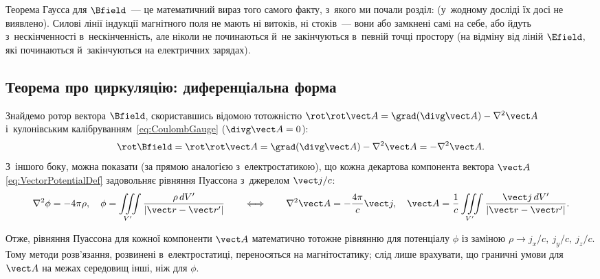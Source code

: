\begin{Attention}[unbreakable]
	Теорема Гаусса для $\Bfield$~--- це математичний вираз того самого факту, з~якого ми
	почали розділ:  (у~жодному досліді їх досі не
	виявлено). Силові лінії індукції магнітного поля не мають ні витоків, ні стоків~---
	вони або замкнені самі на себе, або йдуть з~нескінченності в~нескінченність, але
	ніколи не починаються й~не закінчуються в~певній точці простору (на відміну від ліній
	$\Efield$, які починаються й~закінчуються на електричних зарядах).
\end{Attention}


\subsection*{Теорема про циркуляцію: диференціальна форма}


Знайдемо ротор вектора $\Bfield$, скориставшись відомою тотожністю $\rot\rot\vect A =
	\grad(\divg\vect A) - \nabla^2\vect A$ і~кулонівським
калібруванням~\eqref{eq:CoulombGauge} ($\divg\vect A = 0$):
\begin{equation}\label{eq:CurlBDiff}
	\rot\Bfield = \rot\rot\vect A = \grad(\divg\vect A) - \nabla^2\vect A = -\nabla^2\vect A.
\end{equation}
З~іншого боку, можна показати (за прямою аналогією з~електростатикою), що кожна декартова
компонента вектора $\vect A$ \eqref{eq:VectorPotentialDef} задовольняє рівняння Пуассона
з~джерелом $\vect j/c$:
\begin{equation*}
	\nabla^2\phi = -4\pi\rho, \quad \phi = \iiint\limits_{V'} \frac{\rho\, dV'}{|\vect r-\vect r'|} \qquad\Longleftrightarrow\qquad \nabla^2\vect A
	= -\frac{4\pi}c\vect j, \quad \vect A = \frac1c \iiint\limits_{V'} \frac{\vect j\, dV'}{|\vect r-\vect r'|}.
\end{equation*}

Отже, рівняння Пуассона для кожної компоненти $\vect A$ математично тотожне рівнянню для
потенціалу $\phi$ із заміною $\rho \to j_x/c,\ j_y/c,\ j_z/c$. Тому методи розв'язання,
розвинені в~електростатиці, переносяться на магнітостатику; слід лише врахувати, що
граничні умови для $\vect A$ на межах середовищ інші, ніж для $\phi$.

